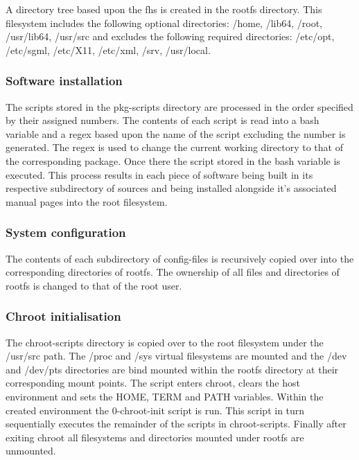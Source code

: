 A directory tree based upon the \gls{fhs} \cite{fhs} is created in the rootfs directory. This filesystem includes the following optional directories: /home, /lib64, /root, /usr/lib64, /usr/src and excludes the following required directories: /etc/opt, /etc/sgml, /etc/X11, /etc/xml, /srv, /usr/local.

\subsubsection{Software installation}

The scripts stored in the pkg-scripts directory are processed in the order specified by their assigned numbers. The contents of each script is read into a bash variable and a \gls{regex} based upon the name of the script excluding the number is generated. The \gls{regex} is used to change the current working directory to that of the corresponding package. Once there the script stored in the bash variable is executed. This process results in each piece of software being built in its respective subdirectory of sources and being installed alongside it's associated manual pages into the root filesystem.


\subsubsection{System configuration}

The contents of each subdirectory of config-files is recursively copied over into the corresponding directories of rootfs. The ownership of all files and directories of rootfs is changed to that of the root user.


\subsubsection{Chroot initialisation}

The chroot-scripts directory is copied over to the root filesystem under the /usr/src path. The /proc and /sys virtual filesystems are mounted and the /dev and /dev/pts directories are bind mounted within the rootfs directory at their corresponding mount points. The script enters chroot, clears the host environment and sets the HOME, TERM and PATH variables. Within the created environment the 0-chroot-init script is run. This script in turn sequentially executes the remainder of the scripts in chroot-scripts. Finally after exiting chroot all filesystems and directories mounted under rootfs are unmounted.

